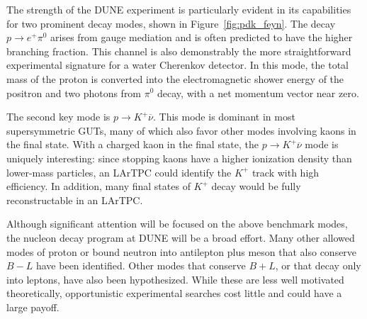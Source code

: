 The strength of the DUNE experiment is particularly evident in its capabilities 
for two prominent decay modes, shown in Figure~\ref{fig:pdk_feyn}. 
The decay $p \rightarrow e^+ \pi^0$ arises from gauge mediation and 
is often predicted to have the higher branching fraction.  This 
channel is also demonstrably the more straightforward 
experimental signature for a water Cherenkov detector.  In this mode,
the total mass of the proton is converted into the electromagnetic
shower energy of the positron and two photons from $\pi^0$ decay,
with a net momentum vector near zero.  

The second key mode is $p \rightarrow K^+ \overline{\nu}$.  This mode is
dominant in most supersymmetric GUTs, many of which also favor other modes
involving kaons in the final state.  With a charged kaon in the final state, 
the $p \rightarrow K^+ \overline{\nu}$ mode is
uniquely interesting: since stopping kaons have a higher ionization density
than lower-mass particles, an LArTPC could identify the $K^+$ track with 
high efficiency.  In addition, many final states of $K^+$ decay would be 
fully reconstructable in an LArTPC.

Although significant attention will be focused on the above benchmark 
modes, the nucleon decay program at DUNE will be a broad effort.
Many other allowed modes of proton or bound neutron into 
antilepton plus meson that also conserve $B-L$ have been identified.  
Other modes that conserve $B+L$, or that decay only into leptons, have also been 
hypothesized.  While these are less well motivated theoretically, opportunistic 
experimental searches cost little and could have a large payoff.

